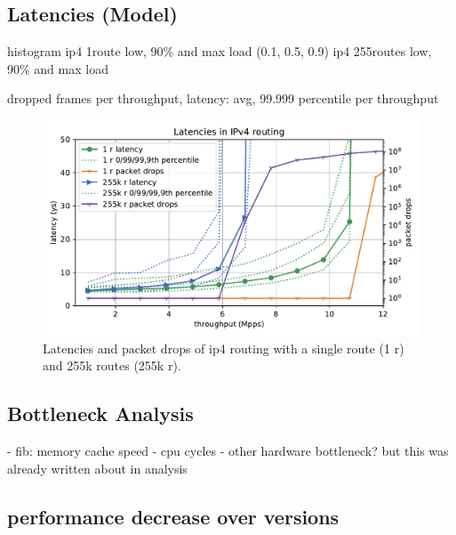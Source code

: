 


\subsection{Latencies (Model)}


histogram
ip4 1route low, 90\% and max load (0.1, 0.5, 0.9)
ip4 255routes low, 90\% and max load

dropped frames per throughput, latency: avg, 99.999 percentile per throughput







\begin{figure}[!ht]
\noindent\hspace{0.5mm}\includegraphics[width=\linewidth]{pics/latencies_per_throughput_summary_ip4.pdf}
\caption{Latencies and packet drops of \Ac{ip4} routing with a single route (1 r) and 255k routes (255k r).  }
\label{graph:latencyoverview}
\end{figure}


\subsection{Bottleneck Analysis}

- fib: memory cache speed
- cpu cycles
- other hardware bottleneck? but this was already written about in analysis

\subsection{performance decrease over versions}

